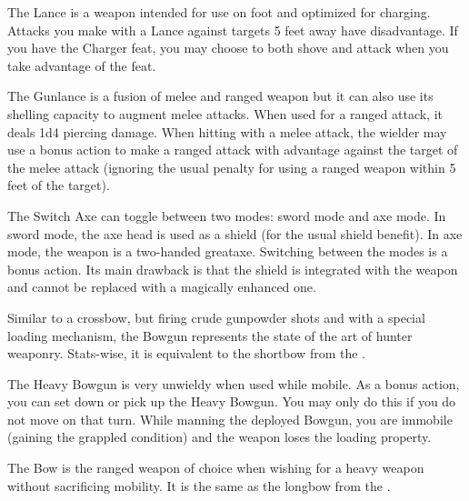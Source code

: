 The Lance is a weapon intended for use on foot and optimized for charging. Attacks you make with a Lance against targets 5 feet away have disadvantage. If you have the Charger feat, you may choose to both shove and attack when you take advantage of the feat.

The Gunlance is a fusion of melee and ranged weapon but it can also use its shelling capacity to augment melee attacks. When used for a ranged attack, it deals 1d4 piercing damage. When hitting with a melee attack, the wielder may use a bonus action to make a ranged attack with advantage against the target of the melee attack (ignoring the usual penalty for using a ranged weapon within 5 feet of the target).

The Switch Axe can toggle between two modes: sword mode and axe mode. In sword mode, the axe head is used as a shield (for the usual shield benefit). In axe mode, the weapon is a two-handed greataxe. Switching between the modes is a bonus action. Its main drawback is that the shield is integrated with the weapon and cannot be replaced with a magically enhanced one.

Similar to a crossbow, but firing crude gunpowder shots and with a special loading mechanism, the Bowgun represents the state of the art of hunter weaponry. Stats-wise, it is equivalent to the shortbow from the \PHB.

The Heavy Bowgun is very unwieldy when used while mobile. As a bonus action, you can set down or pick up the Heavy Bowgun. You may only do this if you do not move on that turn. While manning the deployed Bowgun, you are immobile (gaining the grappled condition) and the weapon loses the loading property.

The Bow is the ranged weapon of choice when wishing for a heavy weapon without sacrificing mobility. It is the same as the longbow from the \PHB.

